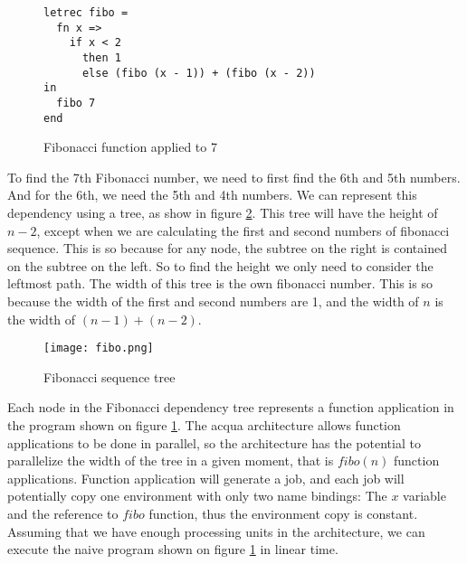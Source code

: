 \begin{figure}
  \caption{Fibonacci function applied to 7}
  \begin{lstlisting}[language=l1]
letrec fibo =
  fn x =>
    if x < 2
      then 1
      else (fibo (x - 1)) + (fibo (x - 2))
in
  fibo 7
end
  \end{lstlisting}
  \label{fig:fib-l1}
\end{figure}

To find the 7th Fibonacci number, we need to first find the 6th and 5th numbers. And for the 6th, we need the 5th and 4th numbers. We can represent this dependency using a tree, as show in figure \ref{fig:fibo}. This tree will have the height of $n-2$, except when we are calculating the first and second numbers of fibonacci sequence. This is so because for any node, the subtree on the right is contained on the subtree on the left. So to find the height we only need to consider the leftmost path. The width of this tree is the own fibonacci number. This is so because the width of the first and second numbers are 1, and the width of $n$ is the width of $(n-1) + (n-2)$.

\begin{figure}
    \caption{Fibonacci sequence tree}
    \centerline{
      \texttt{[image: fibo.png]}
    }
    \label{fig:fibo}
\end{figure}

Each node in the Fibonacci dependency tree represents a function application in the program shown on figure \ref{fig:fib-l1}. The acqua architecture allows function applications to be done in parallel, so the architecture has the potential to parallelize the width of the tree in a given moment, that is $fibo(n)$ function applications. Function application will generate a job, and each job will potentially copy one environment with only two name bindings: The $x$ variable and the reference to $fibo$ function, thus the environment copy is constant. Assuming that we have enough processing units in the architecture, we can execute the naive program shown on figure \ref{fig:fib-l1} in linear time.
\fi
